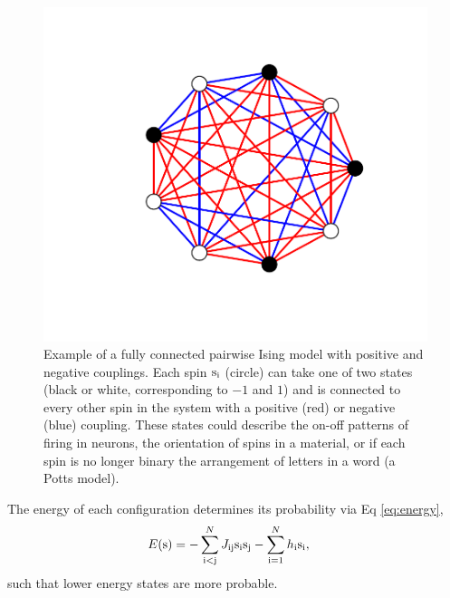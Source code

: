 \documentclass{jors}
\begin{document}
\begin{figure}[tb]\centering
	\includegraphics[width=.65\linewidth,clip,trim={100 70 70 60}]{ising_example.pdf}
\caption{Example of a fully connected pairwise Ising model with positive and negative couplings. Each spin ${\rm s}_{\rm i}$ (circle) can take one of two states (black or white, corresponding to $-1$ and $1$) and is connected to every other spin in the system with a positive (red) or negative (blue) coupling. These states could describe the on-off patterns of firing in neurons, the orientation of spins in a material, or if each spin is no longer binary the arrangement of letters in a word (a Potts model).}
\label{gr:ising}
\end{figure}

The energy of each configuration determines its probability via Eq \eqref{eq:energy},
\begin{align}
	E({\rm s}) &= -\sum_{\rm i<j}^N J_{\rm ij}{\rm s}_{\rm i}{\rm s}_{\rm j} -\sum_{\rm i=1}^Nh_{\rm i}{\rm s}_{\rm i},
\end{align}
such that lower energy states are more probable.
\end{document}
